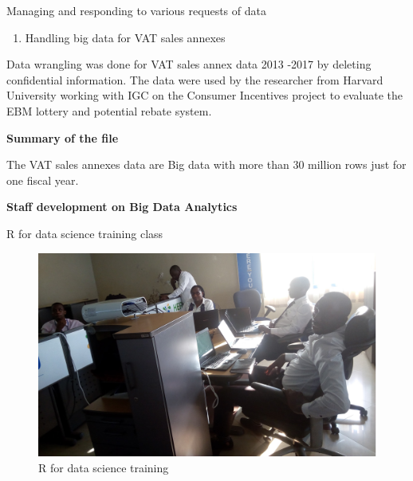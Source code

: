 \documentclass[ignorenonframetext,]{beamer}
\providecommand{\tightlist}{%
  \setlength{\itemsep}{0pt}\setlength{\parskip}{0pt}}
\begin{document}
\begin{frame}{Managing and responding to various requests of data}

\begin{enumerate}
\def\labelenumi{\arabic{enumi})}
\setcounter{enumi}{4}
\tightlist
\item
  Handling big data for VAT sales annexes
\end{enumerate}

Data wrangling was done for VAT sales annex data 2013 -2017 by deleting
confidential information. The data were used by the researcher from
Harvard University working with IGC on the Consumer Incentives project
to evaluate the EBM lottery and potential rebate system.

\end{frame}

\begin{frame}{}

\textbf{Summary of the file}

The VAT sales annexes data are Big data with more than 30 million rows
just for one fiscal year.

\end{frame}

\begin{frame}

\begin{center}
\textbf{Staff development on Big Data Analytics}
\end{center}

\end{frame}

\begin{frame}{R for data science training class}

\begin{figure}
\centering
\includegraphics{Images/training_1.jpg}
\caption{R for data science training}
\end{figure}

\end{frame}
\end{document}
